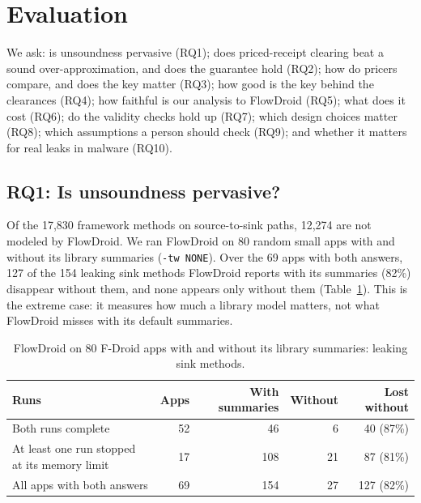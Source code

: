 \section{Evaluation}
\label{sec:eval}
We ask: is unsoundness pervasive (RQ1); does priced-receipt clearing beat a sound over-approximation, and does the guarantee hold (RQ2); how do pricers compare, and does the key matter (RQ3); how good is the key behind the clearances (RQ4); how faithful is our analysis to FlowDroid (RQ5); what does it cost (RQ6); do the validity checks hold up (RQ7); which design choices matter (RQ8); which assumptions a person should check (RQ9); and whether it matters for real leaks in malware (RQ10).

\subsection{RQ1: Is unsoundness pervasive?}
\label{sec:rq1}
Of the 17{,}830 framework methods on source-to-sink paths, 12{,}274 are not modeled by FlowDroid.
We ran FlowDroid on 80 random small apps with and without its library summaries (\texttt{-tw NONE}).
Over the 69 apps with both answers, 127 of the 154 leaking sink methods FlowDroid reports with its summaries (82\%) disappear without them, and none appears only without them (Table~\ref{tab:fd-none}).
This is the extreme case: it measures how much a library model matters, not what FlowDroid misses with its default summaries.
\begin{table}[t]
\caption{FlowDroid on 80 F-Droid apps with and without its library summaries: leaking sink methods.}
\label{tab:fd-none}
\small
\begin{tabular}{@{}lrrrr@{}}
\toprule
Runs & Apps & With summaries & Without & Lost without\\
\midrule
Both runs complete & 52 & 46 & 6 & 40 (87\%)\\
At least one run stopped at its memory limit & 17 & 108 & 21 & 87 (81\%)\\
All apps with both answers & 69 & 154 & 27 & 127 (82\%)\\
\bottomrule
\end{tabular}
\end{table}

